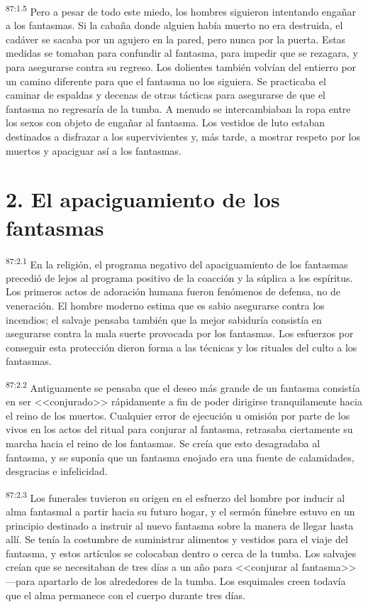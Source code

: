 \documentclass[twoside, 11pt]{book}
\begin{document}
\par
\textsuperscript{87:1.5} Pero a pesar de todo este miedo, los hombres siguieron intentando engañar a los fantasmas. Si la cabaña donde alguien había muerto no era destruida, el cadáver se sacaba por un agujero en la pared, pero nunca por la puerta. Estas medidas se tomaban para confundir al fantasma, para impedir que se rezagara, y para asegurarse contra su regreso. Los dolientes también volvían del entierro por un camino diferente para que el fantasma no los siguiera. Se practicaba el caminar de espaldas y decenas de otras tácticas para asegurarse de que el fantasma no regresaría de la tumba. A menudo se intercambiaban la ropa entre los sexos con objeto de engañar al fantasma. Los vestidos de luto estaban destinados a disfrazar a los supervivientes y, más tarde, a mostrar respeto por los muertos y apaciguar así a los fantasmas.

\section*{2. El apaciguamiento de los fantasmas}
\par
\textsuperscript{87:2.1} En la religión, el programa negativo del apaciguamiento de los fantasmas precedió de lejos al programa positivo de la coacción y la súplica a los espíritus. Los primeros actos de adoración humana fueron fenómenos de defensa, no de veneración. El hombre moderno estima que es sabio asegurarse contra los incendios; el salvaje pensaba también que la mejor sabiduría consistía en asegurarse contra la mala suerte provocada por los fantasmas. Los esfuerzos por conseguir esta protección dieron forma a las técnicas y los rituales del culto a los fantasmas.

\par
\textsuperscript{87:2.2} Antiguamente se pensaba que el deseo más grande de un fantasma consistía en ser <<conjurado>> rápidamente a fin de poder dirigirse tranquilamente hacia el reino de los muertos. Cualquier error de ejecución u omisión por parte de los vivos en los actos del ritual para conjurar al fantasma, retrasaba ciertamente su marcha hacia el reino de los fantasmas. Se creía que esto desagradaba al fantasma, y se suponía que un fantasma enojado era una fuente de calamidades, desgracias e infelicidad.

\par
\textsuperscript{87:2.3} Los funerales tuvieron su origen en el esfuerzo del hombre por inducir al alma fantasmal a partir hacia su futuro hogar, y el sermón fúnebre estuvo en un principio destinado a instruir al nuevo fantasma sobre la manera de llegar hasta allí. Se tenía la costumbre de suministrar alimentos y vestidos para el viaje del fantasma, y estos artículos se colocaban dentro o cerca de la tumba. Los salvajes creían que se necesitaban de tres días a un año para <<conjurar al fantasma>> ---para apartarlo de los alrededores de la tumba. Los esquimales creen todavía que el alma permanece con el cuerpo durante tres días.
\end{document}
